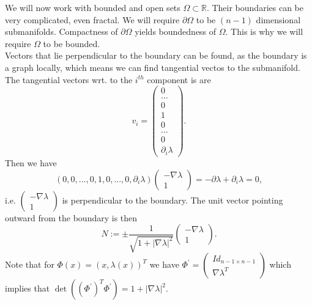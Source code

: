 \documentclass[A4,12pt,twoside]{book}
\begin{document}
We will now work with bounded and open sets $\Omega \subset \mathbb{R}$. Their boundaries can be very complicated, even fractal. We will require $\partial \Omega$ to be $(n-1)$ dimensional submanifolds. Compactness of $\partial \Omega$ yields boundedness of $\Omega$. This is why we will require $\Omega$ to be bounded. \\
Vectors that lie perpendicular to the boundary can be found, as the boundary is a graph locally, which means we can find tangential vectos to the submanifold. The tangential vectors wrt. to the $i^{th}$ component is
are 
\[
v_i= \begin{pmatrix}
    0 \\
    \hdots \\
    0\\
    1 \\
    0\\
    \hdots\\
    0\\
    \partial_i \lambda
\end{pmatrix}.
\]
Then we have 
\[
(0,0,...,0,1,0,...,0,\partial_i \lambda) \begin{pmatrix}
    - \nabla \lambda\\
    1
\end{pmatrix} = - \partial \lambda + \partial_i \lambda =0,
\]
i.e.  $ \begin{pmatrix}
    - \nabla \lambda\\
    1
\end{pmatrix} $ is perpendicular to the boundary. The unit vector pointing outward from the boundary is then 
\[
N:= \pm \frac{1}{\sqrt{1+ |\nabla \lambda|^2}} \begin{pmatrix}
    - \nabla \lambda\\ 1
\end{pmatrix}.
\]
Note that for $\Phi (x) = (x,\lambda(x))^T$ we have $\Phi^\prime = \begin{pmatrix}
    Id_{n-1 \times n-1} \\ \nabla \lambda^T
\end{pmatrix}$ which implies that $\det((\Phi^\prime)^T \Phi^\prime) = 1+|\nabla \lambda|^2$. 
\end{document}
